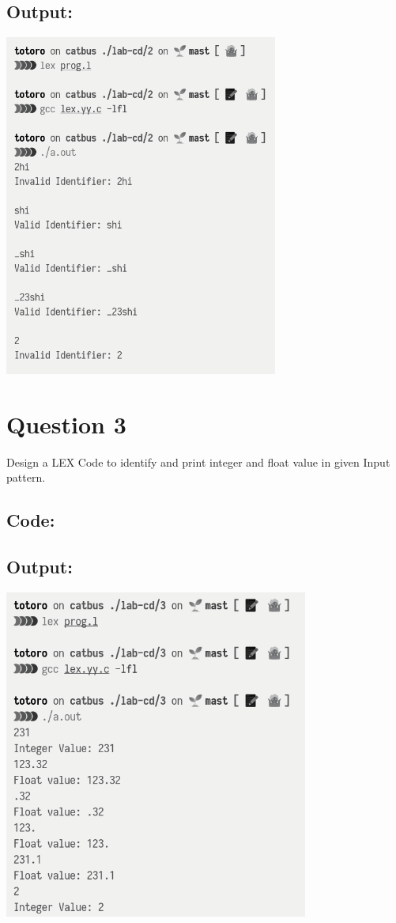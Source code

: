 \documentclass{article}
\begin{document}
\subsection*{Output:}
% 
\begin{center}
  \includegraphics[width=9cm]{2/out.png}
\end{center}

\newpage
\section*{Question 3}
Design a LEX Code to identify and print integer and float
value in given Input pattern.
\subsection*{Code:}

\newpage
\subsection*{Output:}
% 
\begin{center}
  \includegraphics[width=10cm]{3/out.png}
\end{center}
\end{document}

